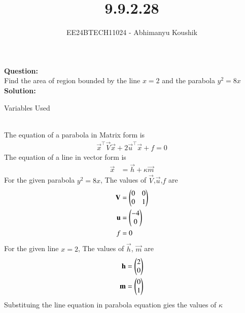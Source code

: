 \documentclass[journal]{IEEEtran}
\begin{document}

\vspace{3cm}

\title{9.9.2.28}
\author{EE24BTECH11024 - Abhimanyu Koushik}
{\let\newpage\relax\maketitle}
\textbf{Question:}\\
Find the area of region bounded by the line $x=2$ and the parabola $y^2=8x$\\
\textbf{Solution:}
\begin{table}[h!]    
  \centering
  
  \caption{Variables Used}
  \label{tab1-1.9-6}
\end{table}\\
The equation of a parabola in Matrix form is
\begin{align}
\vec{x}^\top\vec{V}\vec{x} + 2\vec{u}^\top\vec{x} + f = 0
\end{align}
The equation of a line in vector form is
\begin{align}
\vec{x}&=\vec{h}+\kappa\vec{m}
\end{align}
For the given parabola $y^2=8x$, The values of $\vec{V}$,$\vec{u}$,$f$ are
\begin{align}
\mathbf{V}&=\begin{pmatrix}0 & 0\\0 & 1\end{pmatrix}\\
\mathbf{u}&=\begin{pmatrix}-4\\0\end{pmatrix}\\
f&=0
\end{align}
For the given line $x=2$, The values of $\vec{h}$, $\vec{m}$ are
\begin{align}
\mathbf{h}&=\begin{pmatrix}2\\0\end{pmatrix}\\
\mathbf{m}&=\begin{pmatrix}0\\1\end{pmatrix}
\end{align}
Substituing the line equation in parabola equation gies the values of $\kappa$
\end{document}
